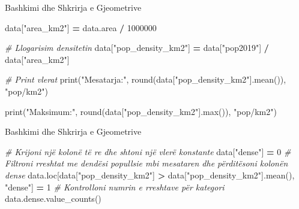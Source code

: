\documentclass[
  ignorenonframetext,
]{beamer}
\newenvironment{Shaded}{\begin{snugshade}}{\end{snugshade}}
\newcommand{\BuiltInTok}[1]{#1}
\newcommand{\CommentTok}[1]{\textcolor[rgb]{0.56,0.35,0.01}{\textit{#1}}}
\newcommand{\DecValTok}[1]{\textcolor[rgb]{0.00,0.00,0.81}{#1}}
\newcommand{\NormalTok}[1]{#1}
\newcommand{\OperatorTok}[1]{\textcolor[rgb]{0.81,0.36,0.00}{\textbf{#1}}}
\newcommand{\StringTok}[1]{\textcolor[rgb]{0.31,0.60,0.02}{#1}}
\begin{document}
\begin{frame}[fragile]{Bashkimi dhe Shkrirja e Gjeometrive}
\protect\hypertarget{bashkimi-dhe-shkrirja-e-gjeometrive-5}{}
\begin{Shaded}
\begin{Highlighting}[]
\NormalTok{data[}\StringTok{"area\_km2"}\NormalTok{] }\OperatorTok{=}\NormalTok{ data.area }\OperatorTok{/} \DecValTok{1000000}

\CommentTok{\# Llogarisim densitetin}
\NormalTok{data[}\StringTok{"pop\_density\_km2"}\NormalTok{] }\OperatorTok{=}\NormalTok{ data[}\StringTok{"pop2019"}\NormalTok{] }\OperatorTok{/}\NormalTok{ data[}\StringTok{"area\_km2"}\NormalTok{]}

\CommentTok{\# Print vlerat}
\BuiltInTok{print}\NormalTok{(}\StringTok{"Mesatarja:"}\NormalTok{, }\BuiltInTok{round}\NormalTok{(data[}\StringTok{"pop\_density\_km2"}\NormalTok{].mean()), }\StringTok{"pop/km2"}\NormalTok{)}

\BuiltInTok{print}\NormalTok{(}\StringTok{"Maksimum:"}\NormalTok{, }\BuiltInTok{round}\NormalTok{(data[}\StringTok{"pop\_density\_km2"}\NormalTok{].}\BuiltInTok{max}\NormalTok{()), }\StringTok{"pop/km2"}\NormalTok{)}
\end{Highlighting}
\end{Shaded}
\end{frame}

\begin{frame}[fragile]{Bashkimi dhe Shkrirja e Gjeometrive}
\protect\hypertarget{bashkimi-dhe-shkrirja-e-gjeometrive-6}{}

\begin{Shaded}
\begin{Highlighting}[]
\CommentTok{\# Krijoni një kolonë të re dhe shtoni një vlerë konstante}
\NormalTok{data[}\StringTok{"dense"}\NormalTok{] }\OperatorTok{=} \DecValTok{0}
\CommentTok{\# Filtroni rreshtat me dendësi popullsie mbi mesataren dhe përditësoni kolonën \textasciigrave{}dense\textasciigrave{}}
\NormalTok{data.loc[data[}\StringTok{"pop\_density\_km2"}\NormalTok{] }\OperatorTok{\textgreater{}}\NormalTok{ data[}\StringTok{"pop\_density\_km2"}\NormalTok{].mean(), }\StringTok{"dense"}\NormalTok{] }\OperatorTok{=} \DecValTok{1}
\CommentTok{\# Kontrolloni numrin e rreshtave për kategori}
\NormalTok{data.dense.value\_counts()}
\end{Highlighting}
\end{Shaded}
\end{frame}
\end{document}
